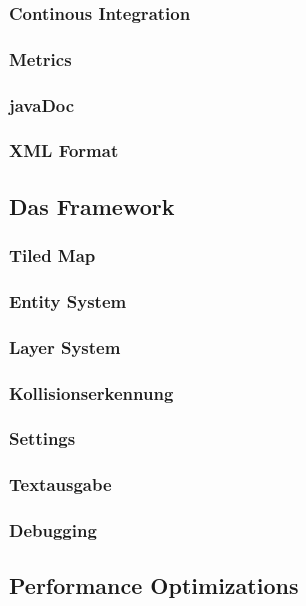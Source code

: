 		\subsubsection{Continous Integration}
		\subsubsection{Metrics}
		\subsubsection{javaDoc}
		\subsubsection{XML Format}
	\subsection{Das Framework}
		\subsubsection{Tiled Map}
		\subsubsection{Entity System}
		\subsubsection{Layer System}
		\subsubsection{Kollisionserkennung}
		\subsubsection{Settings}
		\subsubsection{Textausgabe}
		\subsubsection{Debugging}
	\subsection{Performance Optimizations}
